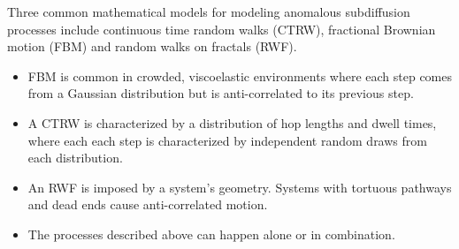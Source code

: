 \documentclass{article}
\begin{document}
  \noindent Three common mathematical models for modeling anomalous subdiffusion
  processes include continuous time random walks (CTRW), fractional Brownian motion
  (FBM) and random walks on fractals (RWF).\cite{meroz_toolbox_2015}
  \begin{itemize}
    \item FBM is common in crowded, viscoelastic environments where each step comes 
    from a Gaussian distribution but is anti-correlated to its previous 
    step.~\cite{mandelbrot_fractional_1968,jeon_fractional_2010,banks_anomalous_2005}
    \item A CTRW is characterized by a distribution of hop lengths and 
    dwell times, where each each step is characterized by independent random draws from 
    each distribution.\cite{montroll_random_1965,morrin_three_2018}
    \item An RWF is imposed by a system's geometry. Systems with tortuous pathways and dead
    ends cause anti-correlated motion.\cite{meroz_toolbox_2015,neusius_subdiffusion_2008}
    \item The processes described above can happen alone or in combination.  	
  \end{itemize}

\end{document}
